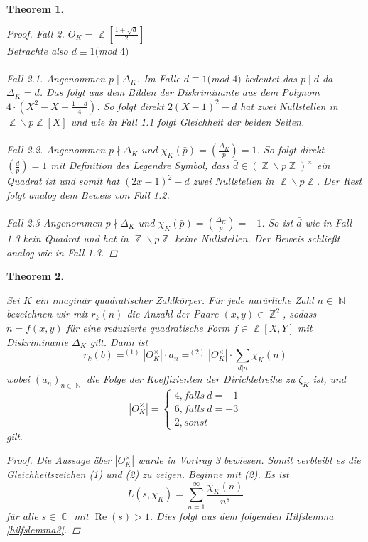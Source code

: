 \documentclass[10pt,a4paper]{article}
\theoremstyle{plain}
\newtheorem{thm}{Theorem}[section]
\theoremstyle{definition}
\theoremstyle{remark}
\DeclareMathOperator{\C}{\mathbb{C}}
\DeclareMathOperator{\Z}{\mathbb{Z}}
\DeclareMathOperator{\N}{\mathbb{N}}
\DeclareMathOperator{\re}{Re}
\begin{document}
\begin{thm}
\begin{proof}
\textit{Fall 2.}
$O_K= \Z[\frac{1+\sqrt{d}}{2}]$ \\
Betrachte also $d\equiv 1 ($mod $ 4)$ 
\\
\\
\textit{Fall 2.1.}
Angenommen $p \mid \Delta_K$. Im Falle $d\equiv 1 ($mod $ 4)$ bedeutet das $p\mid d$ da  $\Delta_K=d$. Das folgt aus dem Bilden der Diskriminante aus dem Polynom $4\cdot(X^2-X+\frac{1-d}{4})$. So folgt direkt $2(X-1)^{2}-d$ hat zwei Nullstellen in $\Z\backslash p\Z[X]$ und wie in Fall 1.1 folgt Gleichheit der beiden Seiten.
\\
\\
\textit{Fall 2.2.}
Angenommen $p\nmid \Delta_K$ und $\chi_K(\bar{p})=(\frac{\Delta_K}{p})=1$. So folgt direkt $(\frac{d}{p})=1$ mit Definition des Legendre Symbol, dass $\bar{d} \in (\Z\backslash p\Z)^\times$ ein Quadrat ist und somit hat $(2x-1)^2-d$ zwei Nullstellen in $\Z\backslash p\Z$. Der Rest folgt analog dem Beweis von Fall 1.2.
\\
\\
\textit{Fall 2.3}
Angenommen $p\nmid \Delta_K$ und $\chi_K(\bar{p})=(\frac{\Delta_K}{p})=-1$. So ist $\bar{d}$ wie in Fall 1.3 kein Quadrat und hat in $\Z\backslash p\Z$ keine Nullstellen. Der Beweis schließt analog wie in Fall 1.3.


\end{proof}
\end{thm}

\begin{thm}\label{theo16}

Sei $\textit{K}$ ein imaginär quadratischer Zahlkörper. Für jede natürliche Zahl $n \in \N$ bezeichnen wir mit $r_k(n)$ die Anzahl der Paare $(x,y) \in \Z^2$, sodass $n = f(x,y)$ für eine reduzierte quadratische Form $f \in \Z[X,Y]$ mit Diskriminante $\Delta_K$ gilt. Dann ist $$r_k(b) =^{(1)} |O_K^\times|\cdot a_n =^{(2)} |O_K^\times|\cdot \sum_{d|n}\chi_K(n)$$wobei $(a_n)_{n \in \N}$ die Folge der Koeffizienten der Dirichletreihe zu $\zeta_K$ ist, und $$|O_K^\times|=\begin{cases}4, falls \ d = -1\\6, falls \ d = -3\\2, sonst\end{cases}$$ gilt.
\\
\begin{proof}\renewcommand{\qedsymbol}{}
Die Aussage über $|O_K^\times|$ wurde in Vortrag 3 bewiesen. Somit verbleibt es die Gleichheitszeichen (1) und (2) zu zeigen. Beginne mit (2). Es ist $$L(s,\chi_K)=\sum_{n=1}^{\infty}\frac{\chi_K(n)}{n^s}$$ für alle $s \in \C $ mit $ \re(s) > 1$. Dies folgt aus dem folgenden Hilfslemma \ref{hilfslemma3}.
 
 \end{proof}
 \end{thm}
 
\end{document}
